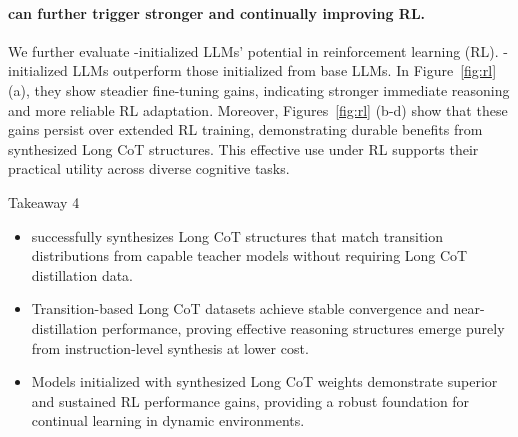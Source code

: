 \paragraph{\textbf{\method can further trigger stronger and continually improving RL.}}
We further evaluate \method-initialized LLMs' potential in reinforcement learning (RL). \method-initialized LLMs outperform those initialized from base LLMs. In Figure~\ref{fig:rl} (a), they show steadier fine-tuning gains, indicating stronger immediate reasoning and more reliable RL adaptation.
Moreover, Figures~\ref{fig:rl} (b-d) show that these gains persist over extended RL training, demonstrating durable benefits from synthesized Long CoT structures.
This effective use under RL supports their practical utility across diverse cognitive tasks.

\begin{TakeawayBox}{Takeaway 4}
\begin{itemize}[leftmargin=16pt, itemsep=0pt, topsep=0pt]
    \item \method{} successfully synthesizes Long CoT structures that match transition distributions from capable teacher models without requiring Long CoT distillation data.
    \item Transition-based Long CoT datasets achieve stable convergence and near-distillation performance, proving effective reasoning structures emerge purely from instruction-level synthesis at lower cost.
    \item Models initialized with synthesized Long CoT weights demonstrate superior and sustained RL performance gains, providing a robust foundation for continual learning in dynamic environments.
\end{itemize} 
\end{TakeawayBox}

